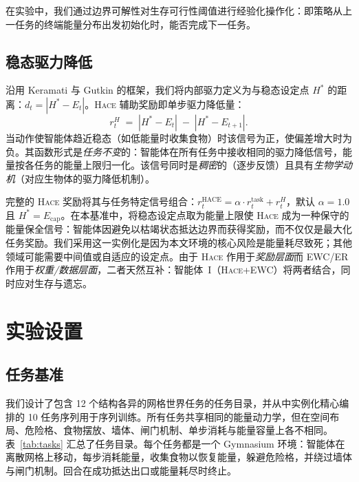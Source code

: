 \documentclass[zihao=5,a4paper,linespread=1.3,fontset=fandol]{ctexart}
\newcommand{\setpoint}{H^*}
\newcommand{\energy}{E}
\newcommand{\drive}{d}
\newcommand{\reward}{r}
\newcommand{\hace}{\textsc{Hace}}
\begin{document}
在实验中，我们通过边界可解性对生存可行性阈值进行经验化操作化：即策略从上一任务的终端能量分布出发初始化时，能否完成下一任务。

\subsection{稳态驱力降低}

沿用 Keramati 与 Gutkin\cite{keramati2014} 的框架，我们将内部驱力定义为与稳态设定点 $\setpoint$ 的距离：$\drive_t = |\setpoint - \energy_t|$。\hace{} 辅助奖励即单步驱力降低量：
\begin{equation}
  \reward_t^H \;=\; |\setpoint - \energy_t| \;-\; |\setpoint - \energy_{t+1}|.
  \label{eq:drive}
\end{equation}
当动作使智能体趋近稳态（如低能量时收集食物）时该信号为正，使偏差增大时为负。其函数形式是\emph{任务不变}的：智能体在所有任务中接收相同的驱力降低信号，能量按各任务的能量上限归一化。该信号同时是\emph{稠密}的（逐步反馈）且具有\emph{生物学动机}（对应生物体的驱力降低机制\cite{keramati2014,konidaris2006}）。

完整的 \hace{} 奖励将其与任务特定信号组合：$\reward_t^{\text{HACE}} = \alpha \cdot \reward_t^{\text{task}} + \reward_t^H$，默认 $\alpha = 1.0$ 且 $\setpoint = \energy_{\text{cap}}$。在本基准中，将稳态设定点取为能量上限使 \hace{} 成为一种保守的能量保全信号：智能体因避免以枯竭状态抵达边界而获得奖励，而不仅仅是最大化任务奖励。我们采用这一实例化是因为本文环境的核心风险是能量耗尽致死；其他领域可能需要中间值或自适应的设定点。由于 \hace{} 作用于\emph{奖励层面}而 EWC/ER 作用于\emph{权重/数据层面}，二者天然互补：智能体~I（\hace{}+EWC）将两者结合，同时应对生存与遗忘。

\section{实验设置}
\label{sec:setup}

\subsection{任务基准}

我们设计了包含 12 个结构各异的网格世界任务的任务目录，并从中实例化精心编排的 10 任务序列用于序列训练。所有任务共享相同的能量动力学，但在空间布局、危险格、食物摆放、墙体、闸门机制、单步消耗与能量容量上各不相同。表~\ref{tab:tasks} 汇总了任务目录。每个任务都是一个 Gymnasium 环境：智能体在离散网格上移动，每步消耗能量，收集食物以恢复能量，躲避危险格，并绕过墙体与闸门机制。回合在成功抵达出口或能量耗尽时终止。
\end{document}
